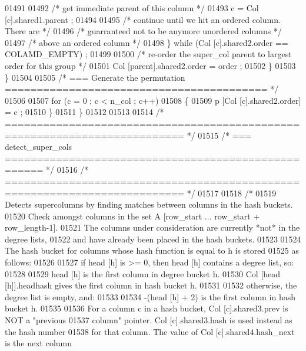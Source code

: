 \begin{DoxyCode}
{{{{{{{{{{{{{{{{{{{{{{{{{{{{01491 
01492     \textcolor{comment}{/* get immediate parent of this column */}
01493     c = Col [c].shared1.parent ;
01494 
01495     \textcolor{comment}{/* continue until we hit an ordered column.  There are */}
01496     \textcolor{comment}{/* guarranteed not to be anymore unordered columns */}
01497     \textcolor{comment}{/* above an ordered column */}
01498       \} \textcolor{keywordflow}{while} (Col [c].shared2.order == COLAMD\_EMPTY) ;
01499 
01500       \textcolor{comment}{/* re-order the super\_col parent to largest order for this group */}
01501       Col [parent].shared2.order = order ;
01502     \}
01503   \}
01504 
01505   \textcolor{comment}{/* === Generate the permutation ========================================= */}
01506 
01507   \textcolor{keywordflow}{for} (c = 0 ; c < n\_col ; c++)
01508   \{
01509     p [Col [c].shared2.order] = c ;
01510   \}
01511 \}
01512 
01513 
01514 \textcolor{comment}{/* ========================================================================== */}
01515 \textcolor{comment}{/* === detect\_super\_cols ==================================================== */}
01516 \textcolor{comment}{/* ========================================================================== */}
01517 
01518 \textcolor{comment}{/*}
01519 \textcolor{comment}{  Detects supercolumns by finding matches between columns in the hash buckets.}
01520 \textcolor{comment}{  Check amongst columns in the set A [row\_start ... row\_start + row\_length-1].}
01521 \textcolor{comment}{  The columns under consideration are currently *not* in the degree lists,}
01522 \textcolor{comment}{  and have already been placed in the hash buckets.}
01523 \textcolor{comment}{}
01524 \textcolor{comment}{  The hash bucket for columns whose hash function is equal to h is stored}
01525 \textcolor{comment}{  as follows:}
01526 \textcolor{comment}{}
01527 \textcolor{comment}{  if head [h] is >= 0, then head [h] contains a degree list, so:}
01528 \textcolor{comment}{}
01529 \textcolor{comment}{  head [h] is the first column in degree bucket h.}
01530 \textcolor{comment}{  Col [head [h]].headhash gives the first column in hash bucket h.}
01531 \textcolor{comment}{}
01532 \textcolor{comment}{  otherwise, the degree list is empty, and:}
01533 \textcolor{comment}{}
01534 \textcolor{comment}{  -(head [h] + 2) is the first column in hash bucket h.}
01535 \textcolor{comment}{}
01536 \textcolor{comment}{  For a column c in a hash bucket, Col [c].shared3.prev is NOT a "previous}
01537 \textcolor{comment}{  column" pointer.  Col [c].shared3.hash is used instead as the hash number}
01538 \textcolor{comment}{  for that column.  The value of Col [c].shared4.hash\_next is the next column}
}}}}}}}}}}}}}}}}}}}}}}}}}}}}
\end{DoxyCode}
